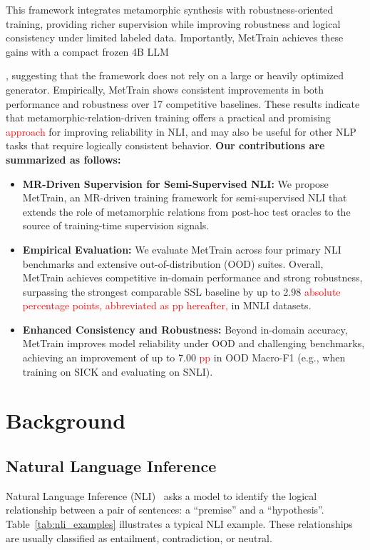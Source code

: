 \documentclass[lettersize,journal]{IEEEtran}
\newcommand{\red}[1]{\textcolor{red}{#1}}
\newif\ifshowcmt
\newcommand{\cmt}[1]{%
	\ifshowcmt
	\textcolor{blue}{/* #1 */}%
	\fi
}
\begin{document}
This framework integrates metamorphic synthesis with robustness-oriented training, providing richer supervision while improving robustness and logical consistency under limited labeled data. Importantly, MetTrain achieves these gains with a compact frozen 4B LLM \cmt{Here, ``compact'' means that the generator LLM has only 4B parameters, which is much smaller than commonly used 7B/8B or larger LLMs. ``Frozen'' means that the generator LLM is used without fine-tuning; its parameters are not updated during MetTrain.}, suggesting that the framework does not rely on a large or heavily optimized generator. Empirically, MetTrain shows consistent improvements in both performance and robustness over 17 competitive baselines. These results indicate that metamorphic-relation-driven training offers a practical and promising \red{approach} for improving reliability in NLI, and may also be useful for other NLP tasks that require logically consistent behavior.
\textbf{Our contributions are summarized as follows:}
\begin{itemize}
	\item \textbf{MR-Driven Supervision for Semi-Supervised NLI:} We propose MetTrain, an MR-driven training framework for semi-supervised NLI that extends the role of metamorphic relations from post-hoc test oracles to the source of training-time supervision signals. 
	\item \textbf{Empirical Evaluation:} We evaluate MetTrain across four primary NLI benchmarks and extensive out-of-distribution (OOD) suites. Overall, MetTrain achieves competitive in-domain performance and strong robustness, surpassing the strongest comparable SSL baseline by up to 2.98 \red{absolute percentage points, abbreviated as pp hereafter,} in MNLI datasets.
	\item \textbf{Enhanced Consistency and Robustness:} Beyond in-domain accuracy, MetTrain improves model reliability under OOD and challenging benchmarks, achieving an improvement of up to 7.00 \red{pp} in OOD Macro-F1 (e.g., when training on SICK and evaluating on SNLI).
\end{itemize}

\section{Background}
\subsection{Natural Language Inference}
Natural Language Inference (NLI)~\cite{DBLP:conf/emnlp/BowmanAPM15} asks a model to identify the logical relationship between a pair of sentences: a ``premise'' and a ``hypothesis''. Table~\ref{tab:nli_examples} illustrates a typical NLI example. These relationships are usually classified as entailment, contradiction, or neutral.
\end{document}
